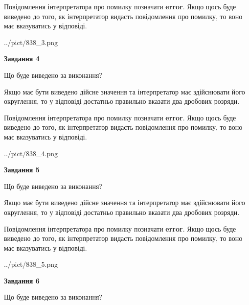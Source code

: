\documentclass[12pt, ukrainian]{article}
\begin{document}
{\begin {Large}
Повідомлення інтерпретатора про помилку позначати \textbf{error}.
Якщо щось буде виведено до того, як інтерпретатор видасть повідомлення про помилку, 
то воно має вказуватись у відповіді. \par

\begin{center}
	{../pict/838_3.png}
\end{center}
\newpage

{\begin {center}\textbf{Завдання 4}\end {center}}\par
Що буде виведено за виконання? \par

Якщо має бути виведено дійсне значення та інтерпретатор має здійснювати його округлення, 
то у відповіді достатньо правильно вказати два дробових розряди.

Повідомлення інтерпретатора про помилку позначати \textbf{error}.
Якщо щось буде виведено до того, як інтерпретатор видасть повідомлення про помилку, 
то воно має вказуватись у відповіді. \par

\begin{center}
	{../pict/838_4.png}
\end{center}
\newpage

{\begin {center}\textbf{Завдання 5}\end {center}}\par
Що буде виведено за виконання? \par

Якщо має бути виведено дійсне значення та інтерпретатор має здійснювати його округлення, 
то у відповіді достатньо правильно вказати два дробових розряди.

Повідомлення інтерпретатора про помилку позначати \textbf{error}.
Якщо щось буде виведено до того, як інтерпретатор видасть повідомлення про помилку, 
то воно має вказуватись у відповіді. \par

\begin{center}
	{../pict/838_5.png}
\end{center}
\newpage

{\begin {center}\textbf{Завдання 6}\end {center}}\par
Що буде виведено за виконання? \par


\end{Large}}
\end{document}
